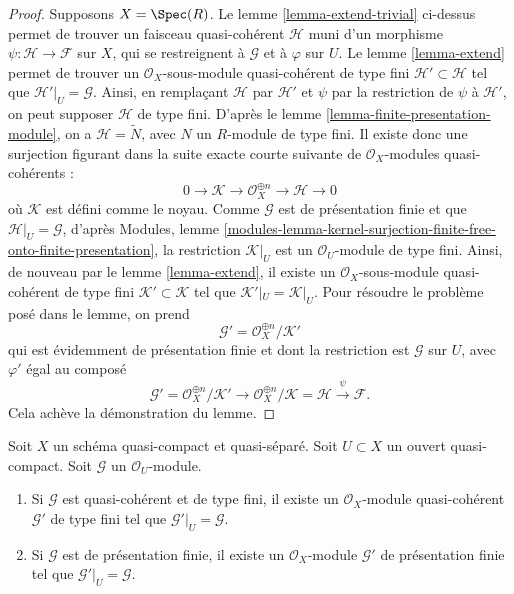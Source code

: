 \begin{proof}
\medskip\noindent
Supposons $X = \Spec(R)$.
Le lemme \ref{lemma-extend-trivial} ci-dessus permet
de trouver un faisceau quasi-cohérent $\mathcal{H}$ muni
d'un morphisme $\psi : \mathcal{H} \to \mathcal{F}$ sur $X$,
qui se restreignent à $\mathcal{G}$ et à $\varphi$ sur $U$.
Le lemme \ref{lemma-extend} permet de trouver un
$\mathcal{O}_X$-sous-module quasi-cohérent de type fini
$\mathcal{H}' \subset \mathcal{H}$
tel que $\mathcal{H}'|_U = \mathcal{G}$. Ainsi, en
remplaçant $\mathcal{H}$ par $\mathcal{H}'$
et $\psi$ par la restriction de $\psi$ à $\mathcal{H}'$,
on peut supposer $\mathcal{H}$ de type fini.
D'après le lemme \ref{lemma-finite-presentation-module},
on a $\mathcal{H} = \widetilde{N}$, avec
$N$ un $R$-module de type fini. Il existe donc une surjection
figurant dans la suite exacte courte suivante de
$\mathcal{O}_X$-modules quasi-cohérents :
$$
0 \to \mathcal{K} \to \mathcal{O}_X^{\oplus n} \to \mathcal{H} \to 0
$$
où $\mathcal{K}$ est défini comme le noyau.
Comme $\mathcal{G}$ est de présentation finie et que
$\mathcal{H}|_U = \mathcal{G}$, d'après
Modules, lemme
\ref{modules-lemma-kernel-surjection-finite-free-onto-finite-presentation},
la restriction $\mathcal{K}|_U$ est
un $\mathcal{O}_U$-module de type fini. Ainsi, de nouveau par le lemme \ref{lemma-extend},
il existe un
$\mathcal{O}_X$-sous-module quasi-cohérent de type fini $\mathcal{K}' \subset \mathcal{K}$ tel
que $\mathcal{K}'|_U = \mathcal{K}|_U$. Pour résoudre le problème
posé dans le lemme, on prend
$$
\mathcal{G}' = \mathcal{O}_X^{\oplus n}/\mathcal{K}'
$$
qui est évidemment de présentation finie et dont la restriction est $\mathcal{G}$
sur $U$, avec $\varphi'$ égal au composé
$$
\mathcal{G}' = \mathcal{O}_X^{\oplus n}/\mathcal{K}'
\to \mathcal{O}_X^{\oplus n}/\mathcal{K} = \mathcal{H} \xrightarrow{\psi}
\mathcal{F}.
$$
Cela achève la démonstration du lemme.
\end{proof}

\begin{lemma}
\label{lemma-lift-finite-presentation}
Soit $X$ un schéma quasi-compact et quasi-séparé. Soit $U \subset X$
un ouvert quasi-compact. Soit $\mathcal{G}$ un $\mathcal{O}_U$-module.
\begin{enumerate}
\item Si $\mathcal{G}$ est quasi-cohérent et de type fini,
il existe un $\mathcal{O}_X$-module quasi-cohérent $\mathcal{G}'$
de type fini tel que $\mathcal{G}'|_U = \mathcal{G}$.
\item Si $\mathcal{G}$ est de présentation finie,
il existe un $\mathcal{O}_X$-module $\mathcal{G}'$
de présentation finie tel que $\mathcal{G}'|_U = \mathcal{G}$.
\end{enumerate}
\end{lemma}


